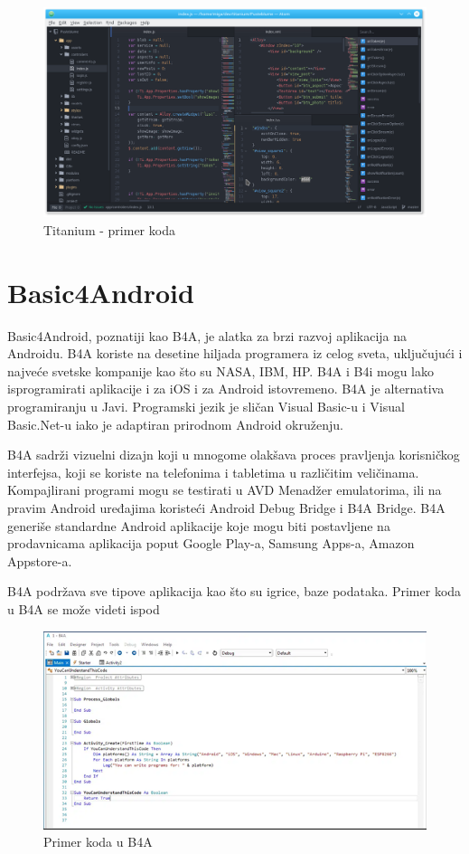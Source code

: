 \documentclass[12pt]{article}
\begin{document}
\begin{figure}[ht!]
    \centering
    \includegraphics[scale=0.3]{Appcelerator.png}
    \caption{Titanium - primer koda}
\end{figure}

\section{Basic4Android}
Basic4Android, poznatiji kao B4A, je alatka za brzi razvoj aplikacija na Androidu. B4A koriste na desetine hiljada programera iz celog sveta, uključujući i najveće svetske kompanije kao što su NASA, IBM, HP.
B4A i B4i mogu lako isprogramirati aplikacije i za iOS i za Android istovremeno. B4A je alternativa programiranju u Javi. Programski jezik je sličan Visual Basic-u i Visual Basic.Net-u iako je adaptiran prirodnom Android okruženju.

B4A sadrži vizuelni dizajn koji u mnogome olakšava proces pravljenja korisničkog interfejsa, koji se koriste na telefonima i tabletima u različitim veličinama. Kompajlirani programi mogu se testirati u AVD Menadžer emulatorima, ili na pravim Android uređajima koristeći Android Debug Bridge i B4A Bridge. 
B4A generiše standardne Android aplikacije koje mogu biti postavljene na prodavnicama aplikacija poput Google Play-a, Samsung Apps-a, Amazon Appstore-a.

B4A podržava sve tipove aplikacija kao što su igrice, baze podataka. Primer koda u B4A se može videti ispod
\begin{figure}[ht!]
    \centering
    \includegraphics[scale=0.9]{b4aslika.png}
    \caption{Primer koda u B4A}
\end{figure}
\end{document}
